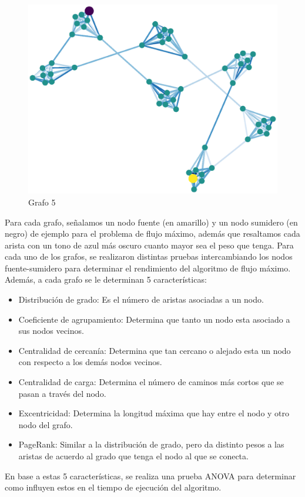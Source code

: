 \documentclass{article}
\begin{document}
\begin{figure}[H]
    \includegraphics[width=\textwidth]{grafo-5}
    \caption{Grafo 5}
    \label{fig:matriz}
\end{figure}
Para cada grafo, señalamos un nodo fuente (en amarillo) y un nodo sumidero (en negro) de ejemplo para el problema de flujo máximo, además que resaltamos cada arista con un tono de azul más oscuro cuanto mayor sea el peso que tenga. Para cada uno de los grafos, se realizaron distintas pruebas intercambiando los nodos fuente-sumidero para determinar el rendimiento del algoritmo de flujo máximo. Además, a cada grafo se le determinan 5 características:
\begin{itemize}
\item Distribución de grado: Es el número de aristas asociadas a un nodo.
\item Coeficiente de agrupamiento: Determina que tanto un nodo esta asociado a sus nodos vecinos.
\item Centralidad de cercanía: Determina que tan cercano o alejado esta un nodo con respecto a los demás nodos vecinos.
\item Centralidad de carga: Determina el número de caminos más cortos que se pasan a través del nodo.
\item Excentricidad: Determina la longitud máxima que hay entre el nodo y otro nodo del grafo.
\item PageRank: Similar a la distribución de grado, pero da distinto pesos a las aristas de acuerdo al grado que tenga el nodo al que se conecta.
\end{itemize}
En base a estas 5 características, se realiza una prueba ANOVA para determinar como influyen estos en el tiempo de ejecución del algoritmo.
\end{document}
